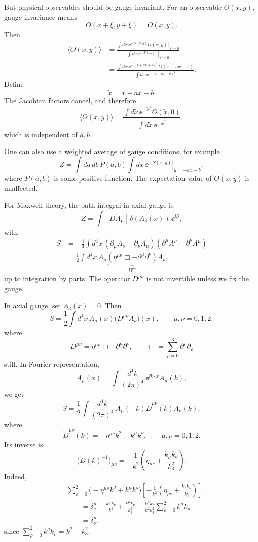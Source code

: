 But physical observables should be gauge-invariant.  For an observable
\(O(x,y)\), gauge invariance means
\[
  O(x+\xi,y+\xi)=O(x,y).
\]
Then
\[
\begin{aligned}
  \langle O(x,y)\rangle
  &=
  \frac{
    \int dx\,
    \left.\ee^{-S(x,y)}O(x,y)\right|_{\ell=0}
  }{
    \int dx\,
    \left.\ee^{-S(x,y)}\right|_{\ell=0}
  }
\\
  &=
  \frac{
    \int dx\,\ee^{-(x+ax+b)^2}\,O(x,-ax-b)
  }{
    \int dx\,\ee^{-(x+ax+b)^2}
  }.
\end{aligned}
\]
Define
\[
  \widetilde x=x+ax+b.
\]
The Jacobian factors cancel, and therefore
\[
  \langle O(x,y)\rangle
  =
  \frac{
    \int d\widetilde x\,\ee^{-\widetilde x^2}O(\widetilde x,0)
  }{
    \int d\widetilde x\,\ee^{-\widetilde x^2}
  },
\]
which is independent of \(a,b\).

One can also use a weighted average of gauge conditions, for example
\[
  Z=
  \int da\,db\,P(a,b)
  \int dx\,
  \left.\ee^{-S(x,y)}\right|_{y=-ax-b},
\]
where \(P(a,b)\) is some positive function.  The expectation value of
\(O(x,y)\) is unaffected.

For Maxwell theory, the path integral in axial gauge is
\[
  Z=\int[DA_\mu]\,\delta(A_3(x))\,\ee^{\ii S},
\]
with
\[
\begin{aligned}
  S
  &=
  -\frac14\int d^4x\,
  (\partial_\mu A_\nu-\partial_\nu A_\mu)
  (\partial^\mu A^\nu-\partial^\nu A^\mu)
\\
  &=
  \frac12\int d^4x\,
  A_\mu
  \underbrace{(\eta^{\mu\nu}\Box-\partial^\mu\partial^\nu)}_{D^{\mu\nu}}
  A_\nu,
\end{aligned}
\]
up to integration by parts.  The operator \(D^{\mu\nu}\) is not invertible
unless we fix the gauge.

In axial gauge, set \(A_3(x)=0\).  Then
\[
  S=
  \frac12\int d^4x\,
  A_\mu(x)\bigl(D^{\mu\nu}A_\nu\bigr)(x),
  \qquad
  \mu,\nu=0,1,2,
\]
where
\[
  D^{\mu\nu}=\eta^{\mu\nu}\Box-\partial^\mu\partial^\nu,
  \qquad
  \Box=\sum_{\rho=0}^3\partial^\rho\partial_\rho
\]
still.  In Fourier representation,
\[
  A_\mu(x)
  =
  \int\frac{d^4k}{(2\pi)^4}\,\ee^{\ii k\cdot x}
  \widetilde A_\mu(k),
\]
we get
\[
  S=
  \frac12\int\frac{d^4k}{(2\pi)^4}\,
  \widetilde A_\mu(-k)\widetilde D^{\mu\nu}(k)\widetilde A_\nu(k),
\]
where
\[
  \widetilde D^{\mu\nu}(k)
  =
  -\eta^{\mu\nu}k^2+k^\mu k^\nu,
  \qquad
  \mu,\nu=0,1,2.
\]
Its inverse is
\[
  \bigl(\widetilde D(k)^{-1}\bigr)_{\mu\nu}
  =
  -\frac{1}{k^2}
  \left(
    \eta_{\mu\nu}+\frac{k_\mu k_\nu}{k_3^2}
  \right).
\]
Indeed,
\[
\begin{aligned}
  &\sum_{\rho=0}^2
  \bigl(-\eta^{\mu\rho}k^2+k^\mu k^\rho\bigr)
  \left[-\frac{1}{k^2}
  \left(\eta_{\rho\nu}+\frac{k_\rho k_\nu}{k_3^2}\right)\right]
\\
  &\qquad =
  \delta^\mu_\nu
  -\frac{k^\mu k_\nu}{k^2}
  +\frac{k^\mu k_\nu}{k_3^2}
  -\frac{k^\mu k_\nu}{k^2k_3^2}
  \sum_{\rho=0}^2 k^\rho k_\rho
\\
  &\qquad =
  \delta^\mu_\nu,
\end{aligned}
\]
since \(\sum_{\rho=0}^2k^\rho k_\rho=k^2-k_3^2\).

